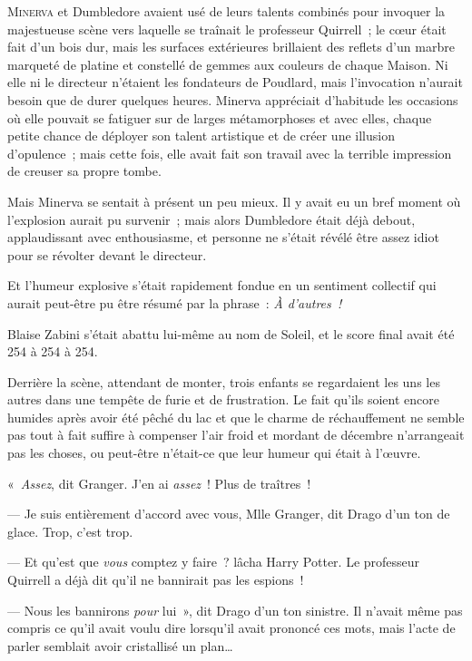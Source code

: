 
\lettrine{M}{inerva} et Dumbledore avaient usé de leurs talents combinés pour invoquer la majestueuse scène vers laquelle se traînait le professeur Quirrell~; le cœur était fait d'un bois dur, mais les surfaces extérieures brillaient des reflets d'un marbre marqueté de platine et constellé de gemmes aux couleurs de chaque Maison.
Ni elle ni le directeur n'étaient les fondateurs de Poudlard, mais l'invocation n'aurait besoin que de durer quelques heures.
Minerva appréciait d'habitude les occasions où elle pouvait se fatiguer sur de larges métamorphoses et avec elles, chaque petite chance de déployer son talent artistique et de créer une illusion d'opulence~; mais cette fois, elle avait fait son travail avec la terrible impression de creuser sa propre tombe.

Mais Minerva se sentait à présent un peu mieux.
Il y avait eu un bref moment où l'explosion aurait pu survenir~; mais alors Dumbledore était déjà debout, applaudissant avec enthousiasme, et personne ne s'était révélé être assez idiot pour se révolter devant le directeur.

Et l'humeur explosive s'était rapidement fondue en un sentiment collectif qui aurait peut-être pu être résumé par la phrase~: \emph{À d'autres~!}

Blaise Zabini s'était abattu lui-même au nom de Soleil, et le score final avait été 254 à 254 à 254.

\later

Derrière la scène, attendant de monter, trois enfants se regardaient les uns les autres dans une tempête de furie et de frustration.
Le fait qu'ils soient encore humides après avoir été pêché du lac et que le charme de réchauffement ne semble pas tout à fait suffire à compenser l'air froid et mordant de décembre n'arrangeait pas les choses, ou peut-être n'était-ce que leur humeur qui était à l'œuvre.

«~\emph{Assez}, dit Granger.
J'en ai \emph{assez}~!
Plus de traîtres~!

--- Je suis entièrement d'accord avec vous, Mlle Granger, dit Drago d'un ton de glace.
Trop, c'est trop.

--- Et qu'est que \emph{vous} comptez y faire~? lâcha Harry Potter.
Le professeur Quirrell a déjà dit qu'il ne bannirait pas les espions~!

--- Nous les bannirons \emph{pour} lui~», dit Drago d'un ton sinistre.
Il n'avait même pas compris ce qu'il avait voulu dire lorsqu'il avait prononcé ces mots, mais l'acte de parler semblait avoir cristallisé un plan…

